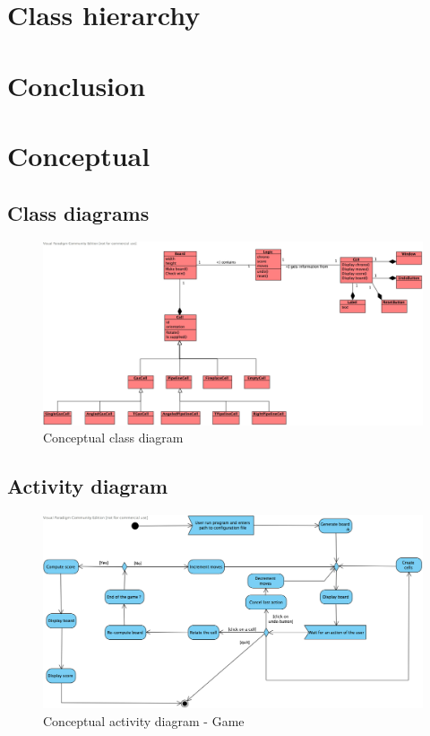 \documentclass[a4paper,11pt]{article}
\begin{document}
\section{Class hierarchy}
\label{sec:cls_hier}
\section{Conclusion}
\appendix
\section{Conceptual}
\subsection{Class diagrams}
\begin{figure}[h]
	\center
	\includegraphics[angle=90,scale=0.8]{Conceptual-Class-diagram.png}
	\caption{Conceptual class diagram}
	\label{fig:concept-class}
\end{figure}

\subsection{Activity diagram}
\begin{figure}[h]
	\center
	\includegraphics[angle=90,scale=0.9]{Conceptual-activity-diagram.png}
	\caption{Conceptual activity diagram - Game}
	\label{fig:concept-activity}
\end{figure}
\end{document}
